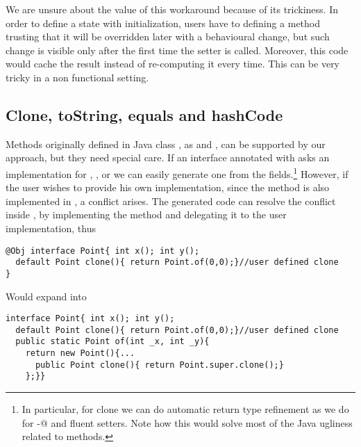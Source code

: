 We are unsure about the value of this workaround because of its trickiness. In
order to define a state with initialization, users have to defining a method trusting that it will be overridden later with a behavioural change, but
such change is visible only after the first time the setter is called. Moreover, this code would cache
the result instead of re-computing it every time. This can be very tricky in a
non functional setting.

\begin{comment}
\subsection{Class Invariants in ClassLess Java}
Since objects are created by automatically generated methods, another limitation
of our current approach is that there is no place where the user can dynamically
check for class invariants. In Java often we see code like
\begin{lstlisting}
class Point{ int x; int y;
  Point(int x; int y){this.x=x;this.y=y; assert this.checkInvariant();}
  private boolean checkInvariant(){... x>0,y>0...}
}
\end{lstlisting} 

We are considering an extension of our annotation where 
default methods with the special name \Q@checkInvariant()@ will be called inside the \Q@of@ methods.
If multiple interfaces are implemented, and more then one offers
\Q@checkInvariant()@,  a composed implementation could be automatically generated, composing by \Q@&&@ the various competing implementations.
\end{comment}

\subsection{Clone, toString, equals and hashCode}

Methods originally defined in Java class \Q@Object@, as \Q@clone@ and
\Q@toString@, can be supported by our approach, but they need special
care. If an interface annotated with \mixin asks an implementation for
\Q@clone@, \Q@toString@, \Q@equals@ or \Q@hashCode@ we can easily
generate one from the fields.\footnote{In particular, for clone we can
  do automatic return type refinement as we do for \Q@with-@ and
  fluent setters. Note how this would solve most of the Java ugliness
  related to \Q@clone@ methods.}
However, if the user wishes to provide his own implementation, since the method is
also implemented in \Q@Object@, a conflict arises. The generated code can resolve the conflict inside \Q@of@, by implementing the method and
delegating it to the user implementation, thus
\begin{lstlisting}
@Obj interface Point{ int x(); int y();
  default Point clone(){ return Point.of(0,0);}//user defined clone
}
\end{lstlisting} 
Would expand into 

\begin{lstlisting}
interface Point{ int x(); int y();
  default Point clone(){ return Point.of(0,0);}//user defined clone
  public static Point of(int _x, int _y){
    return new Point(){...
      public Point clone(){ return Point.super.clone();}
    };}}
\end{lstlisting} 
